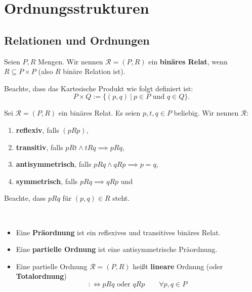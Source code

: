 
\chapter{Ordnungsstrukturen}
\section{Relationen und Ordnungen}

\renewcommand{\|}{~|~}
\begin{definition}
    Seien $P,R$ Mengen. Wir nennen $\mathscr{R} = (P,R)$ ein \textbf{binäres Relat}, 
    wenn $R \subseteq P \times P$ (also $R$ binäre Relation ist).

    Beachte, dass das Kartesische Produkt wie folgt definiert ist:
    $$ P \times Q := \{(p,q) \| p \in P \textrm{ und } q \in Q\}.$$
\end{definition}

\begin{definition}
    Sei $\mathscr{R} = (P,R)$ ein binäres Relat. 
    Es seien $p,t,q \in P$ beliebig.
    Wir nennen $\mathscr{R}$:
    \begin{enumerate}[label=(\arabic*)]
        \item \textbf{reflexiv}, falls $(pRp)$,
        \item \textbf{transitiv}, falls $pRt \land tRq \implies pRq$,
        \item \textbf{antisymmetrisch}, falls $pRq \land qRp \implies p=q$,
        \item \textbf{symmetrisch}, falls $pRq \implies qRp$ und
    \end{enumerate}

    Beachte, dass $pRq$ für $(p,q) \in R$ steht.
\end{definition}

\begin{definition}\
	\begin{itemize}
		\item Eine \textbf{Präordnung} ist ein reflexives und transitives binäres Relat.
		\item Eine \textbf{partielle Ordnung} ist eine antisymmetrische Präordnung.
		\item Eine partielle Ordnung $\mathscr{R} = (P,R)$ heißt \textbf{lineare} Ordnung (oder \textbf{Totalordnung})
    	$$:\Longleftrightarrow pRq \textrm{ oder } qRp\qquad\forall p,q \in P$$
	\end{itemize}
\end{definition}

